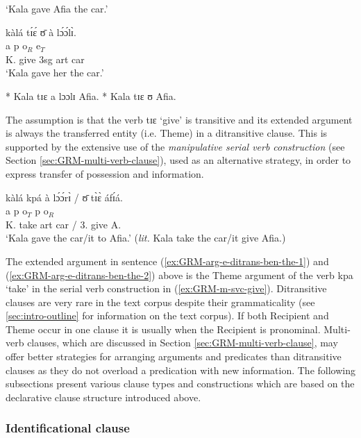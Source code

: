 \glt  `Kala gave Afia the car.' 

 \ex\label{ex:GRM-arg-e-ditrans-ben-the-2}
\glll  kàlá tɪ́ɛ́ ʊ̄  {à lɔ́ɔ́lɪ̀}.\\
{\sc a} {\sc p} {\sc o}$_{R}$ {\sc e}$_{T}$\\
K. give {\sc 3sg}  {{\sc art} car}\\
\glt  `Kala gave her  the car.' 

 \ex\label{ex:GRM-arg-e-ditrans-the-ben-1}
 * Kala tɪɛ a lɔɔlɪ Afia.
 \ex\label{ex:GRM-arg-e-ditrans-the-ben-2}
* Kala tɪɛ ʊ Afia.

\z 
 \z

The assumption is that the verb {\sls tɪɛ} `give'  is transitive and its
extended argument is always the transferred entity (i.e.
Theme) in a ditransitive clause. This is supported by the extensive use of the 
{\it manipulative serial verb construction} (see Section
\ref{sec:GRM-multi-verb-clause}), used as an alternative strategy,  in order to
express transfer of
possession  and information.



\ea\label{ex:GRM-m-svc-give}
\glll  kàlá kpá  {à lɔ́ɔ́rɪ̀ / ʊ̄} tɪ̀ɛ̀ áfɪ́á.\\
{\sc a} {\sc p} {\sc o}$_{T}$  {\sc p}  {\sc o}$_{R}$\\
K. take  {{\sc art} car / 3.\sg} give A.\\

\glt  `Kala gave  the car/it to Afia.' ({\it lit.} Kala take the car/it give
Afia.)
\z

The extended argument in sentence (\ref{ex:GRM-arg-e-ditrans-ben-the-1})  and
(\ref{ex:GRM-arg-e-ditrans-ben-the-2})  above  is the Theme argument 
of the verb {\sls kpa} `take'   in the serial verb construction  in
(\ref{ex:GRM-m-svc-give}).   Ditransitive clauses are
very rare in the text corpus despite their grammaticality (see \ref{sec:intro-outline} for information on the text corpus). If both Recipient and Theme occur in one clause it is usually when the Recipient is pronominal.  Multi-verb clauses, which are discussed in Section \ref{sec:GRM-multi-verb-clause}, may offer better strategies for arranging arguments and predicates than ditransitive clauses as they do not overload a predication with new information. The following subsections present various clause types and
constructions which are based on the declarative clause structure introduced
above.  


\subsubsection{Identificational clause}
\label{sec:GRM-ident-cl}

